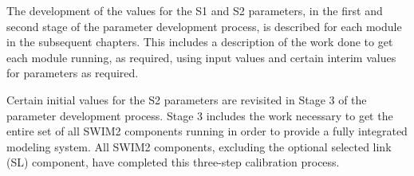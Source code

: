 The development of the values for the S1 and S2 parameters, in the first and second stage of the parameter development process, is described for each module in the subsequent chapters. This includes a description of the work done to get each module running, as required, using input values and certain interim values for parameters as required. 

Certain initial values for the S2 parameters are revisited in Stage 3 of the parameter development process. Stage 3 includes the work necessary to get the entire set of all SWIM2 components running in order to provide a fully integrated modeling system. All SWIM2 components, excluding the optional selected link (SL) component, have completed this three-step calibration process.
